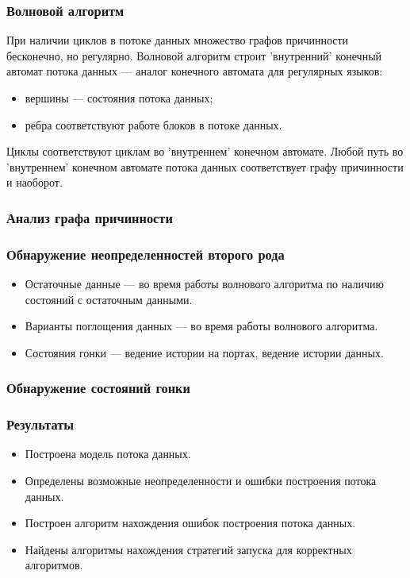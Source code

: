 \documentclass[10pt,pdf,hyperref={unicode}]{beamer}
\begin{document}
\begin{frame}
  \frametitle{Волновой алгоритм}
  При наличии циклов в потоке данных множество графов причинности бесконечно, но регулярно.
  Волновой алгоритм строит 'внутренний' конечный автомат потока данных --- аналог конечного
  автомата для регулярных языков:
  \begin{itemize}
    \item вершины --- состояния потока данных;
    \item ребра соответствуют работе блоков в потоке данных.
  \end{itemize}
  Циклы соответствуют циклам во 'внутреннем' конечном автомате.
  Любой путь во 'внутреннем' конечном автомате потока данных соответствует графу причинности и наоборот.
\end{frame}

\begin{frame}
  \frametitle{Анализ графа причинности}
\end{frame}

\begin{frame}
  \frametitle{Обнаружение неопределенностей второго рода}
  \begin{itemize}
    \item Остаточные данные --- во время работы волнового алгоритма по наличию состояний с остаточным данными.
    \item Варианты поглощения данных --- во время работы волнового алгоритма.
    \item Состояния гонки --- ведение истории на портах, ведение истории данных.
  \end{itemize}
\end{frame}

\begin{frame}
  \frametitle{Обнаружение состояний гонки}
\end{frame}

\begin{frame}
  \frametitle{Результаты}
  \begin{itemize}
    \item Построена модель потока данных.
    \item Определены возможные неопределенности и ошибки построения потока данных.
    \item Построен алгоритм нахождения ошибок построения потока данных.
    \item Найдены алгоритмы нахождения стратегий запуска для корректных алгоритмов.
  \end{itemize}
\end{frame}
\end{document}
